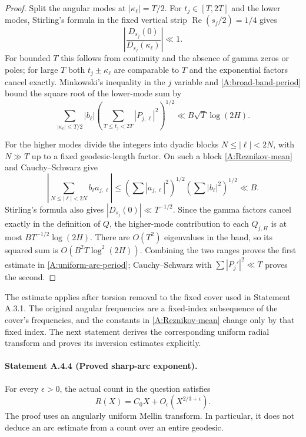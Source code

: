 \begin{proof}
Split the angular modes at $|\kappa_\ell|=T/2$.
For $t_j\in[T,2T]$ and the lower modes, Stirling's formula in the
fixed vertical strip $\operatorname{Re}(s_j/2)=1/4$ gives
\[
 \left|\frac{D_{s_j}(0)}{D_{s_j}(\kappa_\ell)}\right|\ll1.
\]
For bounded $T$ this follows from continuity and the absence of gamma
zeros or poles; for large $T$ both $t_j\pm\kappa_\ell$ are comparable
to $T$ and the exponential factors cancel exactly.
Minkowski's inequality in the $j$ variable and
\eqref{A:broad-band-period} bound the square root of the lower-mode
sum by
\[
 \sum_{|\kappa_\ell|\leq T/2}|b_\ell|
 \left(\sum_{T\leq t_j<2T}|P_{j,\ell}|^2\right)^{1/2}
       \ll B\sqrt T\log(2H).
\]

For the higher modes divide the integers into dyadic blocks
$N\leq|\ell|<2N$, with $N\gg T$ up to a fixed geodesic-length factor.
On such a block \eqref{A:Reznikov-mean} and Cauchy--Schwarz give
\[
 \left|\sum_{N\leq|\ell|<2N}b_\ell a_{j,\ell}\right|
 \leq\left(\sum|a_{j,\ell}|^2\right)^{1/2}
       \left(\sum|b_\ell|^2\right)^{1/2}\ll B.
\]
Stirling's formula also gives $|D_{s_j}(0)|\ll T^{-1/2}$.
Since the gamma factors cancel exactly in the definition of $Q$,
the higher-mode contribution to each $Q_{j,H}$ is at most
$BT^{-1/2}\log(2H)$. There are $O(T^2)$ eigenvalues in the band,
so its squared sum is $O(B^2T\log^2(2H))$.
Combining the two ranges proves the first estimate in
\eqref{A:uniform-arc-period}; Cauchy--Schwarz with
$\sum|P_j'|^2\ll T$ proves the second.
\end{proof}

The estimate applies after torsion removal to the fixed cover used in
Statement A.3.1. The original angular frequencies are a fixed-index
subsequence of the cover's frequencies, and the constants in
\eqref{A:Reznikov-mean} change only by that fixed index. The next statement derives the corresponding uniform radial transform
and proves its inversion estimates explicitly.

\paragraph{Statement A.4.4 (Proved sharp-arc exponent).}
For every $\epsilon>0$, the actual count in the question satisfies
\begin{equation}\label{A:sharp-two-thirds}
 R(X)=C_0X+O_\epsilon(X^{2/3+\epsilon}).
\end{equation}
The proof uses an angularly uniform Mellin transform. In particular, it
does not deduce an arc estimate from a count over an entire geodesic.

